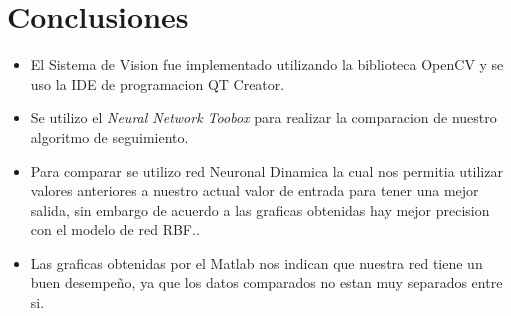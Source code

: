 
\chapter{Conclusiones}

\begin{itemize}
\item El Sistema de Vision fue implementado utilizando la biblioteca OpenCV y se uso la IDE de programacion  QT Creator.
\item Se utilizo el \textit{Neural Network Toobox} para realizar la comparacion de nuestro algoritmo de seguimiento.
\item Para comparar se utilizo red Neuronal Dinamica la cual nos permitia utilizar valores anteriores a nuestro actual valor de entrada para tener una mejor salida, sin embargo de acuerdo a las graficas obtenidas hay mejor precision con el modelo de red RBF..
\item Las graficas obtenidas por el Matlab nos indican que nuestra red tiene un buen desempeño, ya que los datos comparados no estan muy separados entre si.
\end{itemize}